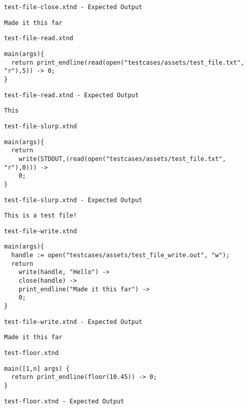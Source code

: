 \medskip \noindent \texttt{test-file-close.xtnd - Expected Output}


\begin{lstlisting}
Made it this far
\end{lstlisting}


\medskip \noindent \texttt{test-file-read.xtnd}


\begin{lstlisting}
main(args){
  return print_endline(read(open("testcases/assets/test_file.txt", "r"),5)) -> 0;
}
\end{lstlisting}


\medskip \noindent \texttt{test-file-read.xtnd - Expected Output}


\begin{lstlisting}
This 
\end{lstlisting}


\medskip \noindent \texttt{test-file-slurp.xtnd}


\begin{lstlisting}
main(args){
  return
    write(STDOUT,(read(open("testcases/assets/test_file.txt", "r"),0))) ->
    0;
}
\end{lstlisting}


\medskip \noindent \texttt{test-file-slurp.xtnd - Expected Output}


\begin{lstlisting}
This is a test file!
\end{lstlisting}


\medskip \noindent \texttt{test-file-write.xtnd}


\begin{lstlisting}
main(args){
  handle := open("testcases/assets/test_file_write.out", "w");
  return
    write(handle, "Hello") ->
    close(handle) ->
    print_endline("Made it this far") ->
    0;
}
\end{lstlisting}


\medskip \noindent \texttt{test-file-write.xtnd - Expected Output}


\begin{lstlisting}
Made it this far
\end{lstlisting}


\medskip \noindent \texttt{test-floor.xtnd}


\begin{lstlisting}
main([1,n] args) {
  return print_endline(floor(10.45)) -> 0;
}
\end{lstlisting}


\medskip \noindent \texttt{test-floor.xtnd - Expected Output}


